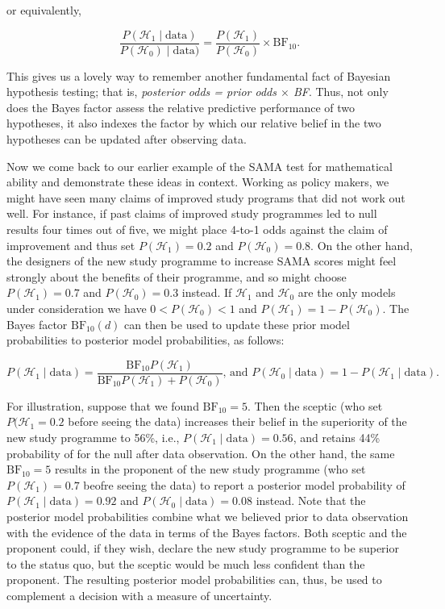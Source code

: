 \documentclass[english,,doc,floatsintext]{apa6}
\begin{document}
or equivalently,

\[
\frac{P(\mathcal{H}_1\mid \text{data})}{P(\mathcal{H}_0) \mid \text{data})} = \frac{P(\mathcal{H}_1)}{P(\mathcal{H}_0)} \times \text{BF}_{10}. 
\]

This gives us a lovely way to remember another fundamental fact of Bayesian hypothesis testing; that is, \emph{posterior odds = prior odds \(\times\) BF}. Thus, not only does the Bayes factor assess the relative predictive performance of two hypotheses, it also indexes the factor by which our relative belief in the two hypotheses can be updated after observing data.

Now we come back to our earlier example of the SAMA test for mathematical ability and demonstrate these ideas in context. Working as policy makers, we might have seen many claims of improved study programs that did not work out well. For instance, if past claims of improved study programmes led to null results four times out of five, we might place 4-to-1 odds against the claim of improvement and thus set \(P( \mathcal{H}_{1}) = 0.2\) and \(P(\mathcal{H}_{0}) = 0.8\). On the other hand, the designers of the new study programme to increase SAMA scores might feel strongly about the benefits of their programme, and so might choose \(P( \mathcal{H}_{1}) = 0.7\) and \(P(\mathcal{H}_{0}) = 0.3\) instead. If \(\mathcal{H}_{1}\) and \(\mathcal{H}_{0}\) are the only models under consideration we have \(0 < P( \mathcal{H}_{0}) < 1\) and \(P( \mathcal{H}_{1})= 1 - P( \mathcal{H}_{0})\). The Bayes factor \(\text{BF}_{10}(d)\) can then be used to update these prior model probabilities to posterior model probabilities, as follows:

\begin{equation}
\label{eqPriorToPosterior}
P(\mathcal{H}_{1} \mid \text{data}) = \frac{ \text{BF}_{10} P(\mathcal{H}_{1})}{\text{BF}_{10} P(\mathcal{H}_{1}) + P(\mathcal{H}_{0})} \text{, and } P(\mathcal{H}_{0} \mid \text{data}) = 1 - P(\mathcal{H}_{1} \mid \text{data}).
\end{equation}

For illustration, suppose that we found \(\text{BF}_{10} = 5\). Then the sceptic (who set \(P(\mathcal{H}_1=0.2\) before seeing the data) increases their belief in the superiority of the new study programme to 56\%, i.e., \(P(\mathcal{H}_{1} \mid \text{data})=0.56\), and retains 44\% probability of for the null after data observation. On the other hand, the same \(\text{BF}_{10} = 5\) results in the proponent of the new study programme (who set \(P(\mathcal{H}_1)=0.7\) beofre seeing the data) to report a posterior model probability of \(P(\mathcal{H}_{1} \mid \text{data})=0.92\) and \(P(\mathcal{H}_{0} \mid \text{data})=0.08\) instead. Note that the posterior model probabilities combine what we believed prior to data observation with the evidence of the data in terms of the Bayes factors. Both sceptic and the proponent could, if they wish, declare the new study programme to be superior to the status quo, but the sceptic would be much less confident than the proponent. The resulting posterior model probabilities can, thus, be used to complement a decision with a measure of uncertainty.
\end{document}
